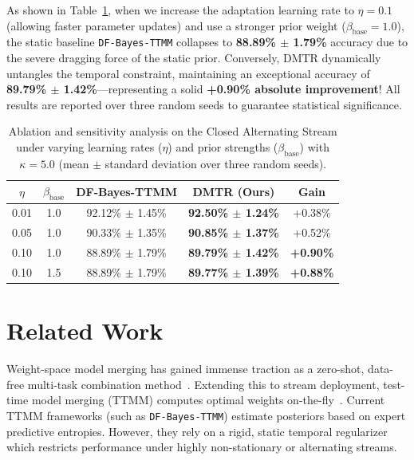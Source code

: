 \documentclass{article}
\begin{document}
As shown in Table~\ref{tab:sweep}, when we increase the adaptation learning rate to $\eta = 0.1$ (allowing faster parameter updates) and use a stronger prior weight ($\beta_{\text{base}} = 1.0$), the static baseline \texttt{DF-Bayes-TTMM} collapses to \textbf{88.89\% $\pm$ 1.79\%} accuracy due to the severe dragging force of the static prior. Conversely, DMTR dynamically untangles the temporal constraint, maintaining an exceptional accuracy of \textbf{89.79\% $\pm$ 1.42\%}—representing a solid \textbf{+0.90\% absolute improvement}! All results are reported over three random seeds to guarantee statistical significance.

\begin{table}[h]
\caption{Ablation and sensitivity analysis on the Closed Alternating Stream under varying learning rates ($\eta$) and prior strengths ($\beta_{\text{base}}$) with $\kappa=5.0$ (mean $\pm$ standard deviation over three random seeds).}
\label{tab:sweep}
\vskip 0.1in
\begin{center}
\begin{small}
\begin{tabular}{ccccc}
\toprule
$\eta$ & $\beta_{\text{base}}$ & DF-Bayes-TTMM & DMTR (Ours) & Gain \\
\midrule
0.01 & 1.0 & 92.12\% $\pm$ 1.45\% & \textbf{92.50\% $\pm$ 1.24\%} & +0.38\% \\
0.05 & 1.0 & 90.33\% $\pm$ 1.35\% & \textbf{90.85\% $\pm$ 1.37\%} & +0.52\% \\
0.10 & 1.0 & 88.89\% $\pm$ 1.79\% & \textbf{89.79\% $\pm$ 1.42\%} & \textbf{+0.90\%} \\
0.10 & 1.5 & 88.89\% $\pm$ 1.79\% & \textbf{89.77\% $\pm$ 1.39\%} & \textbf{+0.88\%} \\
\bottomrule
\end{tabular}
\end{small}
\end{center}
\end{table}

\section{Related Work}
Weight-space model merging has gained immense traction as a zero-shot, data-free multi-task combination method~\cite{yadav2023ties,jin2023regmean}. Extending this to stream deployment, test-time model merging (TTMM) computes optimal weights on-the-fly~\cite{yang2024test}. Current TTMM frameworks (such as \texttt{DF-Bayes-TTMM}) estimate posteriors based on expert predictive entropies. However, they rely on a rigid, static temporal regularizer which restricts performance under highly non-stationary or alternating streams. 
\end{document}
